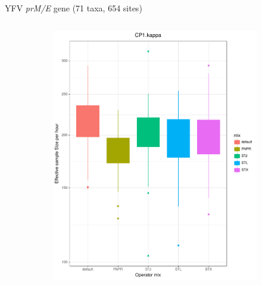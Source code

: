 \documentclass[newPxFont,numfooter,sectionpages]{beamer}
\begin{document}
\begin{frame}{YFV \textit{prM/E} gene (71 taxa, 654 sites)}
\begin{figure}
\begin{column}{0.5\textwidth}
    \begin{figure}
     \includegraphics[width=\textwidth]{figures/ESS_hour_CP1Kappa_YFV.pdf} \\
     \end{figure}
\end{column}
\begin{column}{0.5\textwidth}  %
    \begin{figure}

\end{figure}
\end{column}
\end{figure}
\end{frame}
\end{document}
